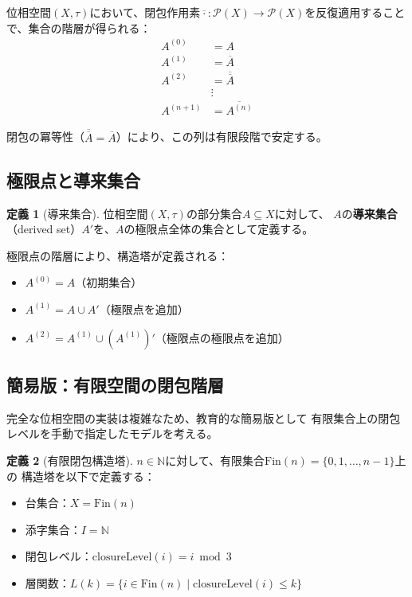 \documentclass[a4paper,12pt]{ltjsarticle}
\theoremstyle{definition}
\newtheorem{definition}{定義}[section]
\begin{document}
位相空間$(X, \tau)$において、閉包作用素$\overline{\cdot}: \mathcal{P}(X) \to \mathcal{P}(X)$を反復適用することで、集合の階層が得られる：
\begin{align*}
A^{(0)} &= A \\
A^{(1)} &= \overline{A} \\
A^{(2)} &= \overline{\overline{A}} \\
&\vdots \\
A^{(n+1)} &= \overline{A^{(n)}}
\end{align*}

閉包の冪等性（$\overline{\overline{A}} = \overline{A}$）により、この列は有限段階で安定する。

\subsection{極限点と導来集合}

\begin{definition}[導来集合]
位相空間$(X, \tau)$の部分集合$A \subseteq X$に対して、
$A$の\textbf{導来集合}（derived set）$A'$を、$A$の極限点全体の集合として定義する。
\end{definition}

極限点の階層により、構造塔が定義される：
\begin{itemize}
\item $A^{(0)} = A$（初期集合）
\item $A^{(1)} = A \cup A'$（極限点を追加）
\item $A^{(2)} = A^{(1)} \cup (A^{(1)})'$（極限点の極限点を追加）
\end{itemize}

\subsection{簡易版：有限空間の閉包階層}

完全な位相空間の実装は複雑なため、教育的な簡易版として
有限集合上の閉包レベルを手動で指定したモデルを考える。

\begin{definition}[有限閉包構造塔]
$n \in \mathbb{N}$に対して、有限集合$\mathrm{Fin}(n) = \{0, 1, \ldots, n-1\}$上の
構造塔を以下で定義する：
\begin{itemize}
\item 台集合：$X = \mathrm{Fin}(n)$
\item 添字集合：$I = \mathbb{N}$
\item 閉包レベル：$\mathrm{closureLevel}(i) = i \bmod 3$
\item 層関数：$L(k) = \{i \in \mathrm{Fin}(n) \mid \mathrm{closureLevel}(i) \leq k\}$
\end{itemize}
\end{definition}
\end{document}

